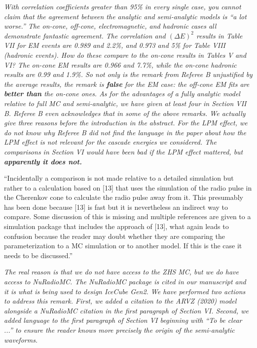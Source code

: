 \documentclass[12pt]{article}
\begin{document}
\textit{With correlation coefficients greater than 95\% in every single case, you cannot claim that the agreement between the analytic and semi-analytic models is ``a lot worse.''  The on-cone, off-cone, electromagnetic, and hadronic cases all demonstrate fantastic agreement.  The correlation and $(\Delta E)^2$ results in Table VII for EM events are 0.989 and 2.2\%, and 0.973 and 5\% for Table VIII (hadronic events).  How do these compare to the on-cone results in Tables V and VI?  The on-cone EM results are 0.966 and 7.7\%, while the on-cone hadronic results are 0.99 and 1.9\%.  So not only is the remark from Referee B unjustified by the average results, the remark is \textbf{false} for the EM case: the off-cone EM fits are \textbf{better than} the on-cone ones.  As for the advantages of a fully analytic model relative to full MC and semi-analytic, we have given at least four in Section VII B.  Referee B even acknowledges that in some of the above remarks.  We actually give three reasons before the introduction in the abstract.  For the LPM effect, we do not know why Referee B did not find the language in the paper about how the LPM effect is not relevant for the cascade energies we considered.  The comparisons in Section VI would have been bad if the LPM effect mattered, but \textbf{apparently it does not.}}

``Incidentally a comparison is not made relative to a detailed simulation but rather to a calculation based on [13] that uses the simulation of the radio pulse in the Cherenkov cone to calculate the radio pulse away from it. This presumably has been done because [13] is fast but it is nevertheless an indirect way to compare. Some discussion of this is missing and multiple references are given to a simulation package that includes the approach of [13], what again leads to confusion because the reader may doubt whether they are comparing the parameterization to a MC simulation or to another model. If this is the case it needs to be discussed.''

\textit{The real reason is that we do not have access to the ZHS MC, but we do have access to NuRadioMC.  The NuRadioMC package is cited in our manuscript and it is what is being used to design IceCube Gen2.  We have performed two actions to address this remark.  First, we added a citation to the ARVZ (2020) model alongside a NuRadioMC citation in the first paragraph of Section VI.  Second, we added language to the first paragraph of Section VI beginning with ``To be clear ...'' to ensure the reader knows more precisely the origin of the semi-analytic waveforms.}
\end{document}

